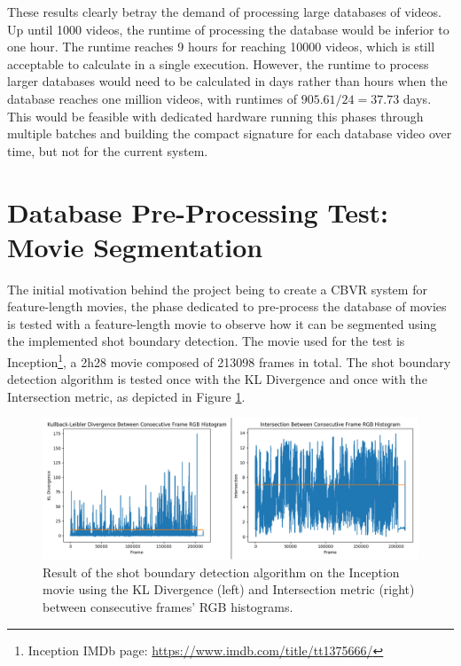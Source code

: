 These results clearly betray the demand of processing large databases of videos. Up until 1000 videos, the runtime of processing the database would be inferior to one hour. The runtime reaches 9 hours for reaching 10000 videos, which is still acceptable to calculate in a single execution. However, the runtime to process larger databases would need to be calculated in days rather than hours when the database reaches one million videos, with runtimes of $905.61/24=37.73$ days. This would be feasible with dedicated hardware running this phases through multiple batches and building the compact signature for each database video over time, but not for the current system.


\section{Database Pre-Processing Test: Movie Segmentation}
\label{sec:evaluation-movie-segmentation-test}

The initial motivation behind the project being to create a CBVR system for feature-length movies, the phase dedicated to pre-process the database of movies is tested with a feature-length movie to observe how it can be segmented using the implemented shot boundary detection. The movie used for the test is Inception\footnote{Inception IMDb page: \url{https://www.imdb.com/title/tt1375666/}}, a 2h28 movie composed of 213098 frames in total. The shot boundary detection algorithm is tested once with the KL Divergence and once with the Intersection metric, as depicted in Figure \ref{fig:evaluation-inception_shot_boundary_detection_test}.\\

\begin{figure}[h] 
\centerline{\includegraphics[width=1.15\textwidth]{figures/evaluation/inception_shot_boundary_detection_test.png}}
\caption{\label{fig:evaluation-inception_shot_boundary_detection_test}Result of the shot boundary detection algorithm on the Inception movie using the KL Divergence (left) and Intersection metric (right) between consecutive frames' RGB histograms.}
\end{figure}

